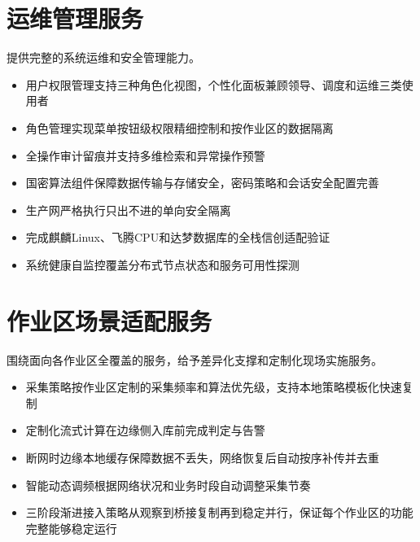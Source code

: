 \documentclass[11pt,a4paper]{ctexart}
\begin{document}
\section{运维管理服务}

提供完整的系统运维和安全管理能力。

\begin{itemize}[leftmargin=*]
  \item 用户权限管理支持三种角色化视图，个性化面板兼顾领导、调度和运维三类使用者
  \item 角色管理实现菜单按钮级权限精细控制和按作业区的数据隔离
  \item 全操作审计留痕并支持多维检索和异常操作预警
  \item 国密算法组件保障数据传输与存储安全，密码策略和会话安全配置完善
  \item 生产网严格执行只出不进的单向安全隔离
  \item 完成麒麟Linux、飞腾CPU和达梦数据库的全栈信创适配验证
  \item 系统健康自监控覆盖分布式节点状态和服务可用性探测
\end{itemize}

\section{作业区场景适配服务}

围绕面向各作业区全覆盖的服务，给予差异化支撑和定制化现场实施服务。

\begin{itemize}[leftmargin=*]
  \item 采集策略按作业区定制的采集频率和算法优先级，支持本地策略模板化快速复制
  \item 定制化流式计算在边缘侧入库前完成判定与告警
  \item 断网时边缘本地缓存保障数据不丢失，网络恢复后自动按序补传并去重
  \item 智能动态调频根据网络状况和业务时段自动调整采集节奏
  \item 三阶段渐进接入策略从观察到桥接复制再到稳定并行，保证每个作业区的功能完整能够稳定运行
\end{itemize}
\end{document}
